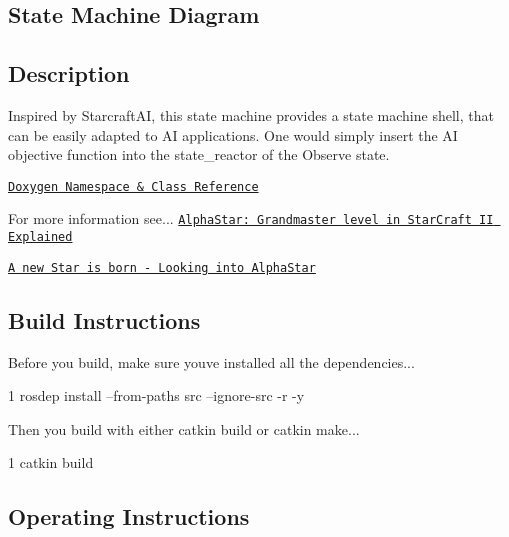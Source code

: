 \subsection*{State Machine Diagram}



\subsection*{Description}

Inspired by Starcraft\+AI, this state machine provides a state machine shell, that can be easily adapted to AI applications. One would simply insert the AI objective function into the state\+\_\+reactor of the Observe state.~\newline


\href{https://reelrbtx.github.io/SMACC_Documentation/master/html/namespacesm__starcraft__ai.html}{\tt Doxygen Namespace \& Class Reference}

For more information see... \href{https://www.google.com/url?sa=t&rct=j&q=&esrc=s&source=web&cd=10&ved=2ahUKEwiThZKprvvnAhVLvZ4KHbKFDHkQFjAJegQIBxAB&url=https%3A%2F%2Fychai.uk%2Fslides%2F2019-11-12-AlphaStarII.pdf&usg=AOvVaw0jRIVMd3gdb4fM4mmQ4nG1l}{\tt Alpha\+Star\+: Grandmaster level in Star\+Craft II Explained}

\href{https://www.google.com/url?sa=t&rct=j&q=&esrc=s&source=web&cd=1&cad=rja&uact=8&ved=2ahUKEwiqtLHorvvnAhUNs54KHZyOBtMQFjAAegQIBhAB&url=https%3A%2F%2Fhci.iwr.uni-heidelberg.de%2Fsystem%2Ffiles%2Fprivate%2Fdownloads%2F1448422913%2Freport_johannes_daub.pdf&usg=AOvVaw1ZfV12L1svm6sYG7Y2E9Wj}{\tt A new Star is born -\/ Looking into Alpha\+Star}

\subsection*{Build Instructions}

Before you build, make sure you\textquotesingle{}ve installed all the dependencies...


\begin{DoxyCode}
1 rosdep install --from-paths src --ignore-src -r -y 
\end{DoxyCode}


Then you build with either catkin build or catkin make...


\begin{DoxyCode}
1 catkin build
\end{DoxyCode}


\subsection*{Operating Instructions}

